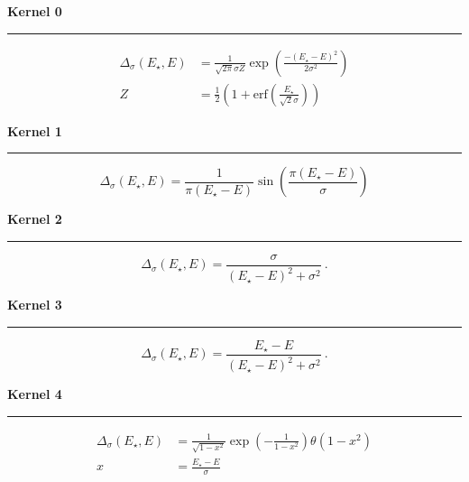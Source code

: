 \documentclass[12pt]{article}
\begin{document}
\centering

{\large\bf Kernel 0}\\
\rule{0.75\textwidth}{1pt}
\begin{align*}
 \Delta_\sigma(E_\star,E) &= \frac{1}{\sqrt{2\pi}\sigma Z}\exp\left(\frac{-(E_\star-E)^2}{2\sigma^2}\right) \\[5mm]
 Z &= \frac{1}{2}\left(1+\mathrm{erf}\left(\frac{E_\star}{\sqrt{2}\sigma}\right)\right)
\end{align*}

\vskip  15mm
{\large\bf Kernel 1}\\
\rule{0.75\textwidth}{1pt}
\begin{equation*}
 \Delta_\sigma(E_\star,E) = \frac{1}{\pi(E_\star-E)}\sin\left(\frac{\pi(E_\star-E)}{\sigma}\right)
\end{equation*}

\vskip  15mm
{\large\bf Kernel 2}\\
\rule{0.75\textwidth}{1pt}
\begin{equation*}
 \Delta_\sigma(E_\star,E) = \frac{\sigma}{(E_\star-E)^2+\sigma^2}~.
\end{equation*}

\vskip  15mm
{\large\bf Kernel 3}\\
\rule{0.75\textwidth}{1pt}
\begin{equation*}
 \Delta_\sigma(E_\star,E) = \frac{E_\star-E}{(E_\star-E)^2+\sigma^2}~.
\end{equation*}

\vskip  15mm
{\large\bf Kernel 4}\\
\rule{0.75\textwidth}{1pt}
\begin{align*}
 \Delta_\sigma(E_\star,E) &= \frac{1}{\sqrt{1-x^2}}\exp\left(-\frac{1}{1-x^2}\right)\theta\left(1-x^2\right) \\[5mm]
 x &= \frac{E_\star-E}{\sigma}
\end{align*}



\pagestyle{empty}
\end{document}
